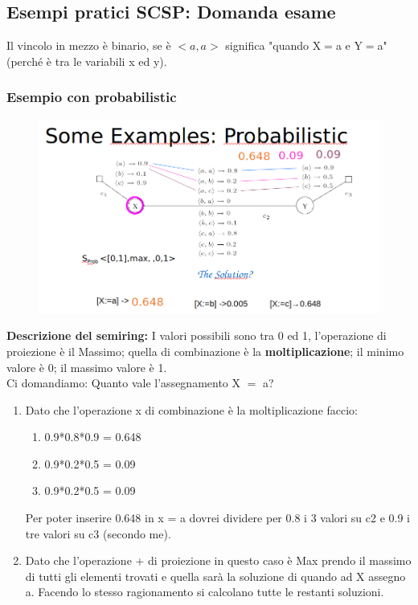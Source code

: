 \subsection{Esempi pratici SCSP: Domanda esame}
Il vincolo in mezzo è binario, se è $< a, a >$ significa "quando X$=$a e Y$=$a" (perché è tra le variabili x ed y).
\subsubsection{Esempio con probabilistic}
\begin{figure}[H]
    \centering
    \includegraphics[width=14cm, keepaspectratio]{img/Cap4/probabilistic2.png}
\end{figure}
\noindent \textbf{Descrizione del semiring:} I valori possibili sono tra 0 ed 1, l'operazione
di proiezione è il Massimo; quella di combinazione è la \textbf{moltiplicazione}; il minimo valore è 0; il massimo valore è 1.
\\Ci domandiamo: Quanto vale l'assegnamento X $=$ a?
\begin{enumerate}
    \item Dato che l'operazione x di combinazione è la moltiplicazione faccio:
          \begin{enumerate}
              \item 0.9*0.8*0.9 = 0.648
              \item 0.9*0.2*0.5 = 0.09
              \item 0.9*0.2*0.5 = 0.09
          \end{enumerate}
          Per poter inserire 0.648 in x = a dovrei dividere per 0.8 i 3 valori su c2 e 0.9 i tre valori su c3 (secondo me).
    \item Dato che l'operazione + di proiezione in questo caso è Max prendo il massimo di tutti gli elementi trovati e quella sarà la soluzione di quando ad X assegno a.
          Facendo lo stesso ragionamento si calcolano tutte le restanti soluzioni.
\end{enumerate}

